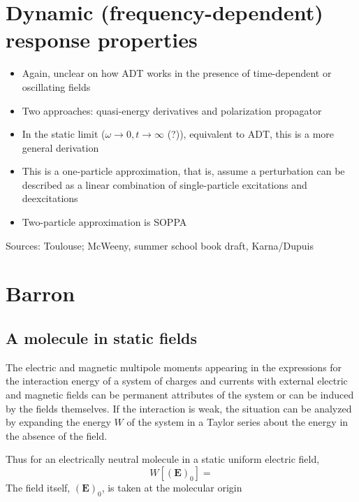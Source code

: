 \documentclass[%
class = book,%
crop = false,%
float = true,%
multi = true,%
preview = false,%
]{standalone}
\begin{document}
\section{Dynamic (frequency-dependent) response properties}

\begin{itemize}
\item Again, unclear on how ADT works in the presence of time-dependent or oscillating fields
\item Two approaches: quasi-energy derivatives and polarization propagator
\item In the static limit (\(\omega \rightarrow 0, t \rightarrow \infty\) (?)), equivalent to ADT, this is a more general derivation
\item This is a one-particle approximation, that is, assume a perturbation can be described as a linear combination of single-particle excitations and deexcitations
\item Two-particle approximation is SOPPA
\end{itemize}

Sources: Toulouse; McWeeny, summer school book draft, Karna/Dupuis

\section{Barron}
\subsection{A molecule in static fields}
The electric and magnetic multipole moments appearing in the expressions for the interaction energy of a system of charges and currents with external electric and magnetic fields can be permanent attributes of the system or can be induced by the fields themselves. If the interaction is weak, the situation can be analyzed by expanding the energy \(W\) of the system in a Taylor series about the energy in the absence of the field.

Thus for an electrically neutral molecule in a static uniform electric field,
\begin{equation}
  \label{eq:2.6.1}
  W[(\mathbf{E})_{0}] =
\end{equation}
The field itself, \((\mathbf{E})_{0}\), is taken at the molecular origin
\end{document}
